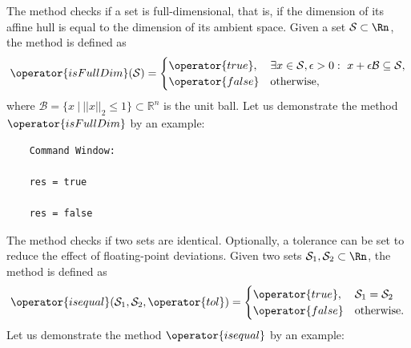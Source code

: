 The method  checks if a set is full-dimensional, that is, if the dimension of its affine hull is equal to the dimension of its ambient space. Given a set $\mathcal{S} \subset \Rn$, the method  is defined as
	\begin{equation*}
		\operator{isFullDim}(\mathcal{S}) =
		\begin{cases}
			\operator{true}, & \exists x \in \mathcal{S}, \epsilon > 0: ~ x + \epsilon \mathcal{B} \subseteq \mathcal{S}, \\
			\operator{false} & \mathrm{otherwise,}
		\end{cases}
	\end{equation*}	
where $\mathcal{B} = \{x ~|~ ||x||_2 \leq 1 \} \subset \mathbb{R}^n$ is the unit ball. Let us demonstrate the method $\operator{isFullDim}$ by an example:

\begin{center}
\begin{minipage}[t]{0.40\textwidth}
	\vspace{10pt}
	\footnotesize
	
\end{minipage}
\begin{minipage}[t]{0.25\textwidth}
	\vspace{10pt}

	\begin{verbatim}	
	Command Window:
	
	res = true
	
	res = false
	\end{verbatim}
\end{minipage}
\end{center}





The method  checks if two sets are identical. Optionally, a tolerance can be set to reduce the effect of floating-point deviations. Given two sets $\mathcal{S}_1,\mathcal{S}_2 \subset \Rn$, the method  is defined as
	\begin{equation*}
		\operator{isequal}(\mathcal{S}_1,\mathcal{S}_2,\operator{tol}) =
		\begin{cases}
			\operator{true}, & \mathcal{S}_1 = \mathcal{S}_2 \\
			\operator{false} & \mathrm{otherwise}.
		\end{cases}
	\end{equation*}	
Let us demonstrate the method $\operator{isequal}$ by an example:

